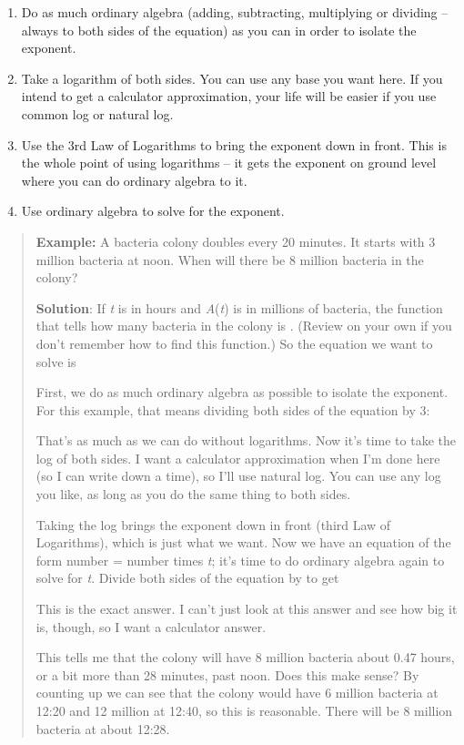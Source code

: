 \begin{enumerate}
\def\labelenumi{\arabic{enumi}.}
\item
  Do as much ordinary algebra (adding, subtracting, multiplying or
  dividing -- always to both sides of the equation) as you can in order
  to isolate the exponent.
\item
  Take a logarithm of both sides. You can use any base you want here. If
  you intend to get a calculator approximation, your life will be easier
  if you use common log or natural log.
\item
  Use the 3rd Law of Logarithms to bring the exponent down in front.
  This is the whole point of using logarithms -- it gets the exponent on
  ground level where you can do ordinary algebra to it.
\item
  Use ordinary algebra to solve for the exponent.
\end{enumerate}

\begin{quote}
\textbf{Example:} A bacteria colony doubles every 20 minutes. It starts
with 3 million bacteria at noon. When will there be 8 million bacteria
in the colony?

\textbf{Solution}: If \emph{t} is in hours and \emph{A}(\emph{t}) is in
millions of bacteria, the function that tells how many bacteria in the
colony is . (Review on your own if you don't remember how to find this
function.) So the equation we want to solve is

First, we do as much ordinary algebra as possible to isolate the
exponent. For this example, that means dividing both sides of the
equation by 3:

That's as much as we can do without logarithms. Now it's time to take
the log of both sides. I want a calculator approximation when I'm done
here (so I can write down a time), so I'll use natural log. You can use
any log you like, as long as you do the same thing to both sides.

Taking the log brings the exponent down in front (third Law of
Logarithms), which is just what we want. Now we have an equation of the
form number = number times \emph{t}; it's time to do ordinary algebra
again to solve for \emph{t}. Divide both sides of the equation by to get

This is the exact answer. I can't just look at this answer and see how
big it is, though, so I want a calculator answer.

This tells me that the colony will have 8 million bacteria about 0.47
hours, or a bit more than 28 minutes, past noon. Does this make sense?
By counting up we can see that the colony would have 6 million bacteria
at 12:20 and 12 million at 12:40, so this is reasonable. There will be 8
million bacteria at about 12:28.
\end{quote}

